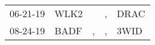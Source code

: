 \begin{supertabular}{p{0.07\textwidth}p{0.06\textwidth}p{0.02\textwidth}p{0.02\textwidth}p{0.06\textwidth}}
 06-21-19\textsuperscript{} &  WLK2\textsuperscript{} &    &  , &  DRAC\textsuperscript{} \\
 08-24-19\textsuperscript{} &  BADF\textsuperscript{} &  , &  , &  3WID\textsuperscript{} \\
\end{supertabular}
